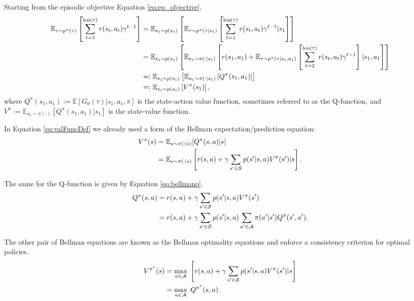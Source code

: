 \documentclass{report}
\numberwithin{equation}{section}
\numberwithin{figure}{section}
\numberwithin{table}{section}
\numberwithin{algorithm}{section}
\begin{document}
Starting from the episodic objective Equation \ref{eq:ep_objective},
\begin{align}\label{eq:valFuncDef}
  \mathbb{E}_{\tau\sim p^{\pi}(\tau)}\left[\sum_{t=1}^{\text{len}(\tau)}r(s_t, a_t)\gamma^{t-1}\right]
  &=\mathbb{E}_{s_1\sim p(s_1)}\left[\mathbb{E}_{\tau\sim p^{\pi}(\tau|s_1)}\left[\sum_{t=1}^{\text{len}(\tau)}r(s_t, a_t)\gamma^{t-1}|s_1\right]\right]\notag\\
  &=\mathbb{E}_{s_1\sim p(s_1)}\left[
      \mathbb{E}_{a_1\sim \pi(\cdot|s_1)}\left[
          r(s_1, a_1) + 
          \mathbb{E}_{\tau\sim p^{\pi}(\tau|s_1,a_1)}\left[\sum_{t=2}^{\text{len}(\tau)}r(s_t, a_t)\gamma^{t-1}\right]|s_1,a_1
        \right]
    \right]\notag\\
  &=:\mathbb{E}_{s_1\sim p(s_1)}\left[
      \mathbb{E}_{a_1\sim \pi(\cdot|s_1)}\left[Q^{\pi}(s_1,a_1)\right]
      \right]\notag\\
      &=:\mathbb{E}_{s_1\sim p(s_1)}\left[
        V^{\pi}(s_1)
      \right],
\end{align}
where $Q^{\pi}(s_1,a_1):=\mathbb{E}[G_0(\tau)|s_1, a_1, \pi]$ is the state-action value function,  
sometimes referred to as the Q-function, and $V^{\pi}:=\mathbb{E}_{a_1\sim\pi(\cdot)}[Q^{\pi}(s_1, a_1)|s_1]$ is the state-value 
function.

In Equation \ref{eq:valFuncDef} we already used a form of the Bellman expectation/prediction 
equation:
\begin{align}\label{eq:bellmanv}
  V^{\pi}(s)&=\mathbb{E}_{a\sim \pi(\cdot|s)}[Q^{\pi}(s, a)|s]\notag\\
  &=\mathbb{E}_{a\sim \pi(\cdot|s)}\left[r(s, a) + \gamma \sum_{s'\in \mathcal{S}}p(s'|s,a)V^{\pi}(s')|s\right].
\end{align}

The same for the Q-function is given by Equation \ref{eq:bellmanq}.
\begin{align}\label{eq:bellmanq}
  Q^{\pi}(s, a)&=r(s, a) + \gamma \sum_{s'\in \mathcal{S}}p(s'|s, a)V^{\pi}(s')\notag\\
  &= r(s,a) + \gamma \sum_{s'\in \mathcal{S}}p(s'|s, a)\sum_{a'\in \mathcal{A}}\pi(a'|s')Q^{\pi}(s', a').
\end{align}

The other pair of Bellman equations are known as the Bellman optimality 
equations and enforce a consistency criterion for optimal policies. 
\begin{align}\label{eq:bellmanOptV}
  V^{\pi^*}(s)&=\max_{a\in \mathcal{A}}\; \left[r(s, a) + \gamma \sum_{s'\in \mathcal{S}}p(s'|s,a)V^{\pi}(s')|s\right]\notag\\
  &=\max_{a\in \mathcal{A}}\;Q^{\pi^*}(s, a).
\end{align}
\end{document}

